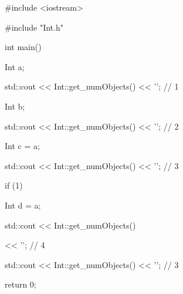 \begin{consolethree}[escapeinside=||]

#include <iostream>

#include "Int.h"



int main()

{

    Int a;

    std::cout << Int::get_numObjects() << '\n'; // 1

    Int b;

    std::cout << Int::get_numObjects() << '\n'; // 2

    Int c = a;

    std::cout << Int::get_numObjects() << '\n'; // 3

    if (1)

    {

        Int d = a;

        std::cout << Int::get_numObjects()

                  << '\n'; // 4

    }

    std::cout << Int::get_numObjects() << '\n'; // 3



    return 0;

}

\end{consolethree}

